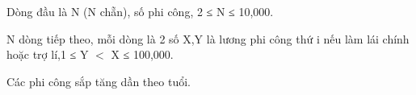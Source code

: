 Dòng đầu là N (N chẵn), số phi công, 2 ≤ N ≤ 10,000.  

   N dòng tiếp theo, mỗi dòng là 2 số X,Y là lương phi công thứ i nếu làm lái chính hoặc trợ lí,1 ≤ Y $<$ X ≤ 100,000.  

   Các phi công sắp tăng dần theo tuổi.